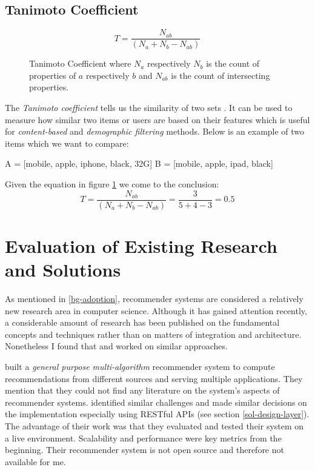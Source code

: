 \subsection{Tanimoto Coefficient}

\begin{figure}[ht]
    \[T = \frac{N_{ab}}{(N_a + N_b - N_{ab})}\]
    \caption[Tanimoto Coefficient]{Tanimoto Coefficient where \(N_a\) respectively \(N_b\) is the count of properties of \(a\) respectively \(b\) and \(N_{ab}\) is the count of intersecting properties.}
    \label{fig:tanimoto}
\end{figure}

The \textit{Tanimoto coefficient} tells us the similarity of two sets \cite{segaran07}. It can be used to measure how similar two items or users are based on their features which is useful for \textit{content-based} and \textit{demographic filtering} methods. Below is an example of two items which we want to compare:

\begin{python}
    A = [mobile, apple, iphone, black, 32G]
    B = [mobile, apple, ipad, black]
\end{python}

Given the equation in figure \ref{fig:tanimoto} we come to the conclusion: \[T = \frac{N_{ab}}{(N_a + N_b - N_{ab})} = \frac{3}{5 + 4 - 3} = 0.5\]



\section{Evaluation of Existing Research and Solutions}
\label{prob-evaluation}

As mentioned in \ref{bg-adoption}, recommender systems are considered a relatively new research area in computer science. Although it has gained attention recently, a considerable amount of research has been published on the fundamental concepts and techniques rather than on matters of integration and architecture. Nonetheless I found that \citet{cortizo10} and \citet{rack07} worked on similar approaches.

\citet{cortizo10} built a \textit{general purpose multi-algorithm} recommender system to compute recommendations from different sources and serving multiple applications. They mention that they could not find any literature on the system's aspects of recommender systems. \citet{cortizo10} identified similar challenges and made similar decisions on the implementation especially using RESTful APIs (see section \ref{sol-design-layer}). The advantage of their work was that they evaluated and tested their system on a live environment. Scalability and performance were key metrics from the beginning. Their recommender system is not open source and therefore not available for me.


